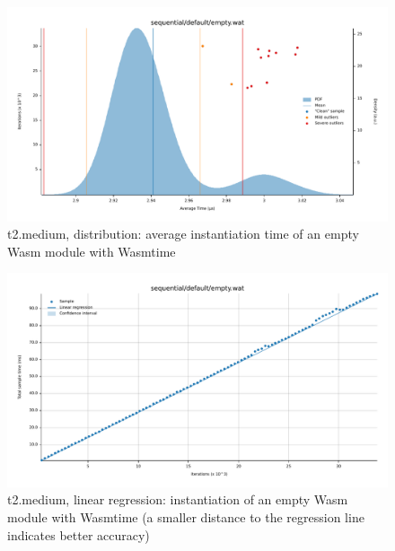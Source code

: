 \begin{figure}[H]
    \centering
        \includegraphics[width=1\linewidth]{images/benches/t2_medium_sequential_default_empty_wasm.pdf}
    \caption{t2.medium, distribution: average instantiation time of an empty Wasm module with Wasmtime}
    \label{fig:bench:instantiation:t2-empty-wasm}
\end{figure}

\begin{figure}[H]
    \centering
        \includegraphics[width=1\linewidth]{images/benches/t2_medium_regression_default_empty.pdf}
    \caption{t2.medium, linear regression: instantiation of an empty Wasm module with Wasmtime (a smaller distance to the regression line indicates better accuracy)}
    \label{fig:bench:instantiation:t2-regression-empty-wasm}
\end{figure}

